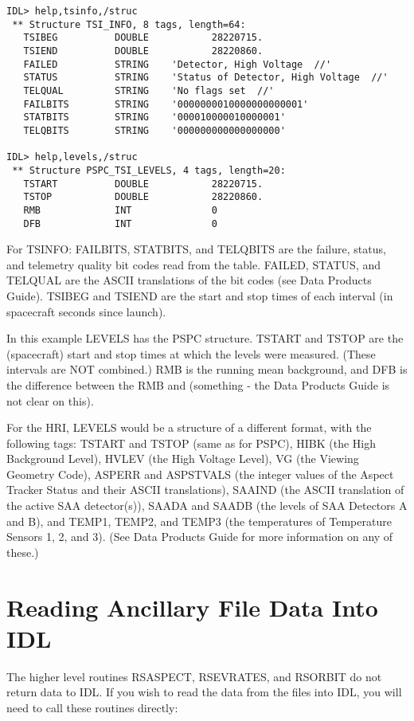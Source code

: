 \medskip\noindent
\begin{verbatim}
IDL> help,tsinfo,/struc
 ** Structure TSI_INFO, 8 tags, length=64:
   TSIBEG          DOUBLE           28220715.
   TSIEND          DOUBLE           28220860.
   FAILED          STRING    'Detector, High Voltage  //'
   STATUS          STRING    'Status of Detector, High Voltage  //'
   TELQUAL         STRING    'No flags set  //'
   FAILBITS        STRING    '0000000010000000000001'
   STATBITS        STRING    '000010000010000001'
   TELQBITS        STRING    '000000000000000000'
 
IDL> help,levels,/struc
 ** Structure PSPC_TSI_LEVELS, 4 tags, length=20:
   TSTART          DOUBLE           28220715.
   TSTOP           DOUBLE           28220860.
   RMB             INT              0
   DFB             INT              0
\end{verbatim}
For TSINFO: FAILBITS, STATBITS, and TELQBITS are the failure, status, and
telemetry quality bit codes read from the table. FAILED, STATUS, and TELQUAL
are the ASCII translations of the bit codes (see Data Products Guide). TSIBEG
and TSIEND are the start and stop times of each interval (in spacecraft seconds
since launch).
 
In this example LEVELS has the PSPC structure. TSTART and TSTOP are the
(spacecraft) start and stop times at which the levels were measured. (These
intervals are NOT combined.) RMB is the running mean background, and DFB is the
difference between the RMB and (something - the Data Products Guide is not
clear on this).
 
For the HRI, LEVELS would be a structure of a different format, with the
following tags: TSTART and TSTOP (same as for PSPC), HIBK (the High Background
Level), HVLEV (the High Voltage Level), VG (the Viewing Geometry Code), ASPERR
and ASPSTVALS (the integer values of the Aspect Tracker Status and their ASCII
translations), SAAIND (the ASCII translation of the active SAA detector(s)),
SAADA and SAADB (the levels of SAA Detectors A and B), and TEMP1, TEMP2, and
TEMP3 (the temperatures of Temperature Sensors 1, 2, and 3). (See Data Products
Guide for more information on any of these.)
 

\section{Reading Ancillary File Data Into IDL}
 
The higher level routines RSASPECT, RSEVRATES, and RSORBIT do not return data
to IDL. If you wish to read the data from the files into IDL, you will need to
call these routines directly:

